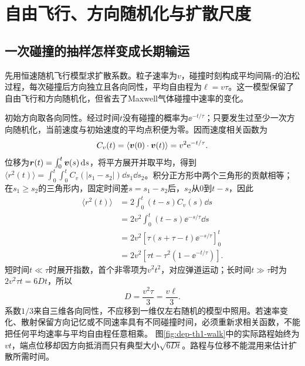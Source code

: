 \section{自由飞行、方向随机化与扩散尺度}
\subsection{一次碰撞的抽样怎样变成长期输运}
先用恒速随机飞行模型求扩散系数。粒子速率为$v$，碰撞时刻构成平均间隔$\tau$的泊松过程，每次碰撞后方向独立且各向同性，平均自由程为$\ell=v\tau$。这一模型保留了自由飞行和方向随机化，但省去了Maxwell气体碰撞中速率的变化。

初始方向取各向同性。经过时间$t$没有碰撞的概率为$\ee^{-t/\tau}$；只要发生过至少一次方向随机化，当前速度与初始速度的平均点积便为零。因而速度相关函数为
\[
 C_v(t)=\langle\bm{v}(0)\cdot\bm{v}(t)\rangle=v^2\mathrm e^{-t/\tau}.
\]
位移为$\bm{r}(t)=\int_0^t\bm{v}(s)\mathop{}\!\mathrm d s$，将平方展开并取平均，得到$\langle r^2(t)\rangle=\int_0^t\int_0^t C_v(|s_1-s_2|)\dd s_1\dd s_2$。积分正方形中两个三角形的贡献相等；在$s_1\ge s_2$的三角形内，固定时间差$s=s_1-s_2$后，$s_2$从$0$到$t-s$，因此
\begin{align*}
 \langle r^2(t)\rangle
 &=2\int_0^t(t-s)C_v(s)\dd s\\
 &=2v^2\int_0^t(t-s)\ee^{-s/\tau}\dd s\\
 &=2v^2\left[\tau(s+\tau-t)\ee^{-s/\tau}\right]_0^t\\
 &=2v^2[\tau t-\tau^2(1-\ee^{-t/\tau})].
\end{align*}
短时间$t\ll\tau$时展开指数，首个非零项为$v^2t^2$，对应弹道运动；长时间$t\gg\tau$时为$2v^2\tau t=6Dt$，所以
\[
 D=\frac{v^2\tau}{3}=\frac{v\ell}{3}.
\]
系数$1/3$来自三维各向同性，不应移到一维仅左右随机的模型中照用。若速率变化、散射保留方向记忆或不同速率具有不同碰撞时间，必须重新求相关函数，不能把任何平均速率与平均自由程任意相乘。
图\ref{fig:dep-th1-walk}中的实际路程始终为$vt$，端点位移却因方向抵消而只有典型大小$\sqrt{6Dt}$。路程与位移不能混用来估计扩散所需时间。

